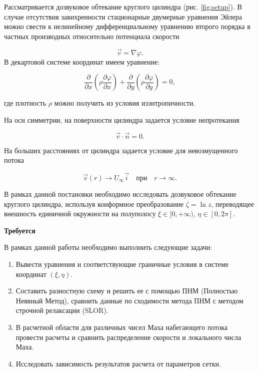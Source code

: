 \documentclass[a4paper,12pt]{article}
\begin{document}
	Рассматривается дозвуковое обтекание круглого цилиндра (рис. \ref{fig:setup}). В случае отсутствия завихренности стационарные двумерные уравнения Эйлера можно свести к нелинейному дифференциальному уравнению второго порядка в частных производных относительно потенциала скорости
	
	\[\vec{v} = \nabla \varphi.\]
	В декартовой системе координат имеем уравнение:
	
	\[
		\frac{\partial}{\partial x} \left( \rho \frac{\partial \varphi}{\partial x} \right) + \frac{\partial}{\partial y} \left( \rho \frac{\partial \varphi}{\partial y} \right) = 0,
	\]
	
	где плотность $\rho$ можно получить из условия изэнтропичности.
	
	На оси симметрии, на поверхности цилиндра задается условие непротекания
	
	

	\[\vec{v} \cdot \vec{n} = 0. \]	

	
	На больших расстояниях от цилиндра задается условие для невозмущенного потока
	
	
	\[ \vec{v}(r) \to U_{\infty} \vec{i} \quad \text{при} \quad r \to \infty.\]	
	
	
	В рамках данной постановки необходимо исследовать дозвуковое обтекание круглого цилиндра, используя конформное преобразование $\zeta = \ln z$, переводящее внешность единичной окружности на полуполосу $\xi \in [0, +\infty)$, $\eta \in [0, 2\pi]$.
	
	\textbf{Требуется}
	
	В рамках данной работы необходимо выполнить следующие задачи:
	
	\begin{enumerate}
		\item Вывести уравнения и соответствующие граничные условия в системе координат \((\xi, \eta)\).
		\item Составить разностную схему и решить ее с помощью ПНМ (Полностью Неявный Метод), сравнить данные по сходимости метода ПНМ с методом строчной релаксации (SLOR).
		\item В расчетной области для различных чисел Маха набегающего потока провести расчеты и сравнить распределение скорости и локального числа Маха.
		\item Исследовать зависимость результатов расчета от параметров сетки.
	\end{enumerate}
	
\end{document}

